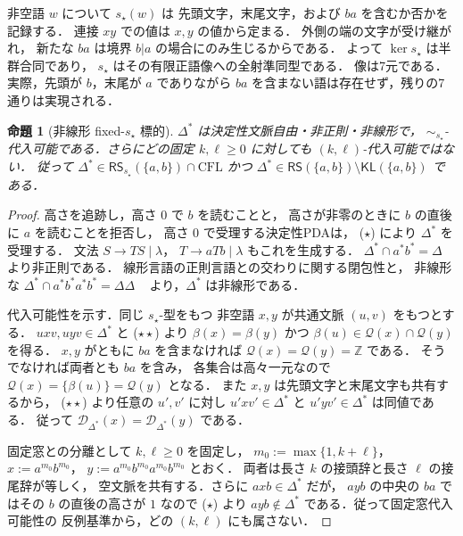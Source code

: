 \documentclass[11pt,a4paper]{ltjsarticle}
\newtheorem{proposition}[theorem]{命題}
\theoremstyle{remark}
\theoremstyle{plain}
\newcommand{\D}{\mathcal{D}}
\begin{document}
非空語 $w$ について $s_\star(w)$ は
先頭文字，末尾文字，および $ba$ を含むか否かを記録する．
連接 $xy$ での値は $x,y$ の値から定まる．
外側の端の文字が受け継がれ，
新たな $ba$ は境界 $b|a$ の場合にのみ生じるからである．
よって $\ker s_\star$ は半群合同であり，
$s_\star$ はその有限正語像への全射準同型である．
像は7元である．実際，先頭が $b$，末尾が $a$ でありながら
$ba$ を含まない語は存在せず，残りの7通りは実現される．

\begin{proposition}[非線形 fixed-$s_\star$ 標的]
\label{prop:nonlinear-rs-example}
$\Delta^*$ は決定性文脈自由・非正則・非線形で，
$\sim_{s_\star}$-代入可能である．さらにどの固定
$k,\ell\ge0$ に対しても $(k,\ell)$-代入可能ではない．
従って $\Delta^*\in\mathsf{RS}_{s_\star}(\{a,b\})
\cap\mathrm{CFL}$ かつ
$\Delta^*\in\mathsf{RS}(\{a,b\})\setminus
\mathsf{KL}(\{a,b\})$ である．
\end{proposition}

\begin{proof}
高さを追跡し，高さ $0$ で $b$ を読むことと，
高さが非零のときに $b$ の直後に $a$ を読むことを拒否し，
高さ $0$ で受理する決定性PDAは，
\textup{($\star$)} により $\Delta^*$ を受理する．
文法 $S\to TS\mid\lambda$，
$T\to aTb\mid\lambda$ もこれを生成する．
$\Delta^*\cap a^*b^*=\Delta$ より非正則である．
線形言語の正則言語との交わりに関する閉包性と，
非線形な
$\Delta^*\cap a^*b^*a^*b^*=\Delta\Delta$
~\cite[Section~6.1, Theorem~6.1 の直前]{autebert1997}
より，$\Delta^*$ は非線形である．

代入可能性を示す．同じ $s_\star$-型をもつ
非空語 $x,y$ が共通文脈 $(u,v)$ をもつとする．
$uxv,uyv\in\Delta^*$ と
\textup{($\star\star$)} より
$\beta(x)=\beta(y)$ かつ
$\beta(u)\in\mathcal Q(x)\cap\mathcal Q(y)$ を得る．
$x,y$ がともに $ba$ を含まなければ
$\mathcal Q(x)=\mathcal Q(y)=\mathbb Z$ である．
そうでなければ両者とも $ba$ を含み，
各集合は高々一元なので
$\mathcal Q(x)=\{\beta(u)\}=\mathcal Q(y)$ となる．
また $x,y$ は先頭文字と末尾文字も共有するから，
\textup{($\star\star$)} より任意の $u',v'$ に対し
$u'xv'\in\Delta^*$ と
$u'yv'\in\Delta^*$ は同値である．
従って $\D_{\Delta^*}(x)=\D_{\Delta^*}(y)$ である．

固定窓との分離として $k,\ell\ge0$ を固定し，
$m_0:=\max\{1,k+\ell\}$，
$x:=a^{m_0}b^{m_0}$，
$y:=a^{m_0}b^{m_0}a^{m_0}b^{m_0}$ とおく．
両者は長さ $k$ の接頭辞と長さ $\ell$ の接尾辞が等しく，
空文脈を共有する．さらに $axb\in\Delta^*$ だが，
$ayb$ の中央の $ba$ ではその $b$ の直後の高さが
$1$ なので \textup{($\star$)} より
$ayb\notin\Delta^*$ である．従って固定窓代入可能性の
反例基準から，どの $(k,\ell)$ にも属さない．
\end{proof}
\end{document}

